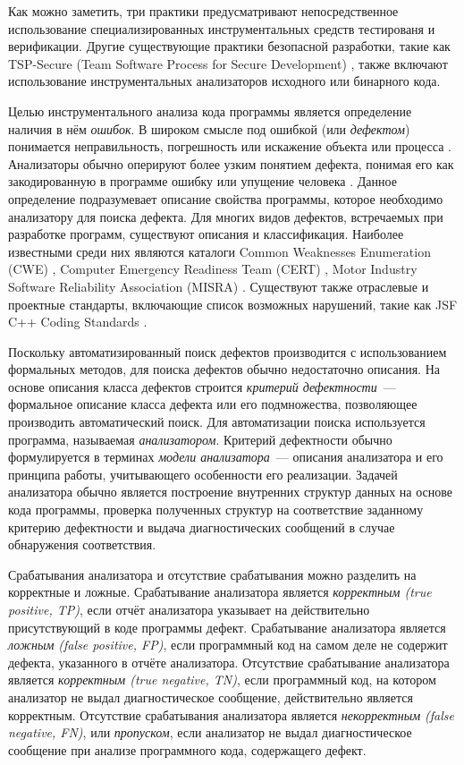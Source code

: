 Как можно заметить, три практики предусматривают непосредственное использование специализированных инструментальных средств тестированя и верификации. Другие существующие практики безопасной разработки, такие как TSP-Secure (Team Software Process for Secure Development) \cite{tsp}, также включают использование инструментальных анализаторов исходного или бинарного кода.

Целью инструментального анализа кода программы является определение наличия в нём \textit{ошибок}. В широком смысле под ошибкой (или \textit{дефектом}) понимается неправильность, погрешность или искажение объекта или процесса \cite{lipaev-soft-eng}. Анализаторы обычно оперируют более узким понятием дефекта, понимая его как закодированную в программе ошибку или упущение человека \cite{cert-book}. Данное определение подразумевает описание свойства программы, которое необходимо анализатору для поиска дефекта. Для многих видов дефектов, встречаемых при разработке программ, существуют описания и классификация. Наиболее известными среди них являются каталоги Common Weaknesses Enumeration (CWE) \cite{cwe}, Computer Emergency Readiness Team (CERT) \cite{cert-org}, Motor Industry Software Reliability Association (MISRA) \cite{misra}. Существуют также отраслевые и проектные стандарты, включающие список возможных нарушений, такие как JSF C++ Coding Standards \cite{jsf}.

Поскольку автоматизированный поиск дефектов производится с использованием формальных методов, для поиска дефектов обычно недостаточно описания. На основе описания класса дефектов строится \textit{критерий дефектности}~--- формальное описание класса дефекта или его подмножества, позволяющее производить автоматический поиск. Для автоматизации поиска используется программа, называемая \textit{анализатором}. Критерий дефектности обычно формулируется в терминах \textit{модели анализатора}~--- описания анализатора и его принципа работы, учитывающего особенности его реализации. Задачей анализатора обычно является построение внутренних структур данных на основе кода программы, проверка полученных структур на соответствие заданному критерию дефектности и выдача диагностических сообщений в случае обнаружения соответствия.

Срабатывания анализатора и отсутствие срабатывания можно разделить на корректные и ложные. Срабатывание анализатора является \textit{корректным (true positive, TP)}, если отчёт анализатора указывает на действительно присутствующий в коде программы дефект. Срабатывание анализатора является \textit{ложным (false positive, FP)}, если программный код на самом деле не содержит дефекта, указанного в отчёте анализатора. Отсутствие срабатывание анализатора является \textit{корректным (true negative, TN)}, если программный код, на котором анализатор не выдал диагностическое сообщение, действительно является корректным. Отсутствие срабатывания анализатора является \textit{некорректным (false negative, FN)}, или \textit{пропуском}, если анализатор не выдал диагностическое сообщение при анализе программного кода, содержащего дефект.

